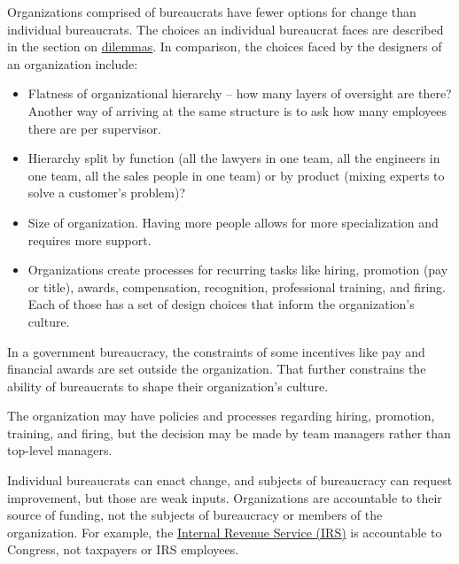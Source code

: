 Organizations comprised of bureaucrats have fewer options for change than individual bureaucrats. The choices an individual bureaucrat faces are described
\iftoggle{haspagenumbers}{on page~\pageref{sec:dilemma-trilemma}}{}
 in the section on 
\hyperref[sec:dilemma-trilemma]{dilemmas}.
In comparison, the choices faced by the designers of an organization include:
\begin{itemize}
    \item Flatness of organizational hierarchy -- how many layers of oversight are there? Another way of arriving at the same structure is to ask how many employees there are per supervisor.
    \item Hierarchy split by function (all the lawyers in one team, all the engineers in one team, all the sales people in one team) or by product (mixing experts to solve a customer's problem)?

    
    \item Size of organization. Having more people allows for more specialization and requires more support. 
    
    \item Organizations create processes for recurring tasks like hiring, promotion (pay or title), awards, compensation, recognition, professional training, and firing. Each of those has a set of design choices that inform the organization's culture.
\end{itemize}
In a government bureaucracy, the constraints of some incentives like pay and financial awards are set outside the organization. That further constrains the ability of bureaucrats to shape their organization's culture.

The organization may have policies and processes regarding hiring, promotion, training, and firing, but the decision may be made by team managers rather than top-level managers. 

Individual bureaucrats can enact change, and subjects of bureaucracy can request improvement, but those are weak inputs. 
Organizations are accountable to their source of funding, not the subjects of bureaucracy or members of the organization. For example, the \href{https://en.wikipedia.org/wiki/Internal_Revenue_Service}{Internal Revenue Service (IRS)} 
%
is accountable to Congress, not taxpayers or IRS employees. 



